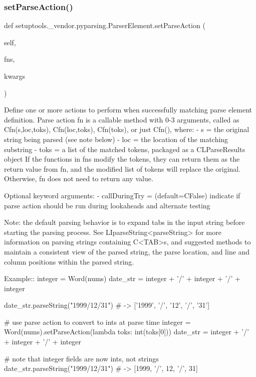 \subsubsection{\texorpdfstring{set\+Parse\+Action()}{setParseAction()}}
{\footnotesize\ttfamily def setuptools.\+\_\+vendor.\+pyparsing.\+Parser\+Element.\+set\+Parse\+Action (\begin{DoxyParamCaption}\item[{}]{self,  }\item[{}]{fns,  }\item[{}]{kwargs }\end{DoxyParamCaption})}

\begin{DoxyVerb}Define one or more actions to perform when successfully matching parse element definition.
Parse action fn is a callable method with 0-3 arguments, called as C{fn(s,loc,toks)},
C{fn(loc,toks)}, C{fn(toks)}, or just C{fn()}, where:
 - s   = the original string being parsed (see note below)
 - loc = the location of the matching substring
 - toks = a list of the matched tokens, packaged as a C{L{ParseResults}} object
If the functions in fns modify the tokens, they can return them as the return
value from fn, and the modified list of tokens will replace the original.
Otherwise, fn does not need to return any value.

Optional keyword arguments:
 - callDuringTry = (default=C{False}) indicate if parse action should be run during lookaheads and alternate testing

Note: the default parsing behavior is to expand tabs in the input string
before starting the parsing process.  See L{I{parseString}<parseString>} for more information
on parsing strings containing C{<TAB>}s, and suggested methods to maintain a
consistent view of the parsed string, the parse location, and line and column
positions within the parsed string.

Example::
    integer = Word(nums)
    date_str = integer + '/' + integer + '/' + integer

    date_str.parseString("1999/12/31")  # -> ['1999', '/', '12', '/', '31']

    # use parse action to convert to ints at parse time
    integer = Word(nums).setParseAction(lambda toks: int(toks[0]))
    date_str = integer + '/' + integer + '/' + integer

    # note that integer fields are now ints, not strings
    date_str.parseString("1999/12/31")  # -> [1999, '/', 12, '/', 31]
\end{DoxyVerb}
 \mbox{\label{classsetuptools_1_1__vendor_1_1pyparsing_1_1ParserElement_a3c4dc5305a3369fad37fc46442079a69}} 
